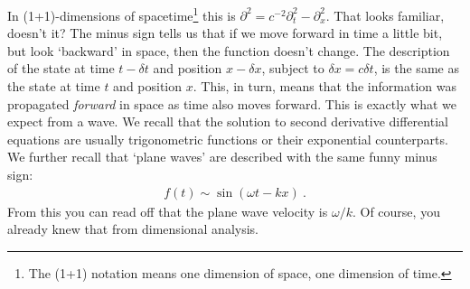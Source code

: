 In (1+1)-dimensions of spacetime\footnote{The (1+1) notation means one dimension of space, one dimension of time.} this is $\partial^2 = c^{-2} \partial_t^2 - \partial_x^2$. That looks familiar, doesn't it? The minus sign tells us that if we move forward in time a little bit, but look `backward' in space, then the function doesn't change. The description of the state at time $t-\delta t$ and position $x-\delta x$, subject to $\delta x = c\delta t$, is the same as the state at time $t$ and position $x$. 
%
This, in turn, means that the information was propagated \emph{forward} in space as time also moves forward. This is exactly what we expect from a wave. We recall that the solution to second derivative differential equations are usually trigonometric functions or their exponential counterparts. We further recall that `plane waves' are described with the same funny minus sign:
\begin{align}
	f(t) \sim \sin (\omega t - kx) \ .
	\label{eq:plane:wave}
\end{align}
From this you can read off that the plane wave velocity is $\omega/k$. Of course, you already knew that from dimensional analysis. 

